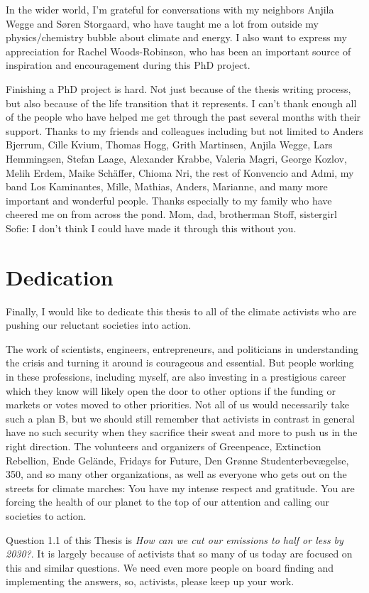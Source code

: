 In the wider world, I'm grateful for conversations with my neighbors Anjila Wegge and S{\o}ren Storgaard, who have taught me a lot from outside my physics/chemistry bubble about climate and energy. I also want to express my appreciation for Rachel Woods-Robinson, who has been an important source of inspiration and encouragement during this PhD project.

Finishing a PhD project is hard. Not just because of the thesis writing process, but also because of the life transition that it represents. I can't thank enough all of the people who have helped me get through the past several months with their support. Thanks to my friends and colleagues including but not limited to Anders Bjerrum, Cille Kvium, Thomas Hogg, Grith Martinsen, Anjila Wegge, Lars Hemmingsen, Stefan Laage, Alexander Krabbe, Valeria Magri, George Kozlov, Melih Erdem, Maike Sch{\"a}ffer, Chioma Nri, the rest of Konvencio and Admi, my band Los Kaminantes, Mille, Mathias, Anders, Marianne, and many more important and wonderful people. Thanks especially to my family who have cheered me on from across the pond. Mom, dad, brotherman Stoff, sistergirl Sofie: I don't think I could have made it through this without you.


\section*{Dedication}

Finally, I would like to dedicate this thesis to all of the climate activists who are pushing our reluctant societies into action. 

The work of scientists, engineers, entrepreneurs, and politicians in understanding the crisis and turning it around is courageous and essential. But people working in these professions, including myself, are also investing in a prestigious career which they know will likely open the door to other options if the funding or markets or votes moved to other priorities. Not all of us would necessarily take such a plan B, but we should still remember that activists in contrast in general have no such security when they sacrifice their sweat and more to push us in the right direction. The volunteers and organizers of Greenpeace, Extinction Rebellion, Ende Gel{\"a}nde, Fridays for Future, Den Gr{\o}nne Studenterbev{\ae}gelse, 350, and so many other organizations, as well as everyone who gets out on the streets for climate marches: You have my intense respect and gratitude. You are forcing the health of our planet to the top of our attention and calling our societies to action. 

Question 1.1 of this Thesis is \textit{How can we cut our emissions to half or less by 2030?}. It is largely because of activists that so many of us today are focused on this and similar questions. We need even more people on board finding and implementing the answers, so, activists, please keep up your work.


